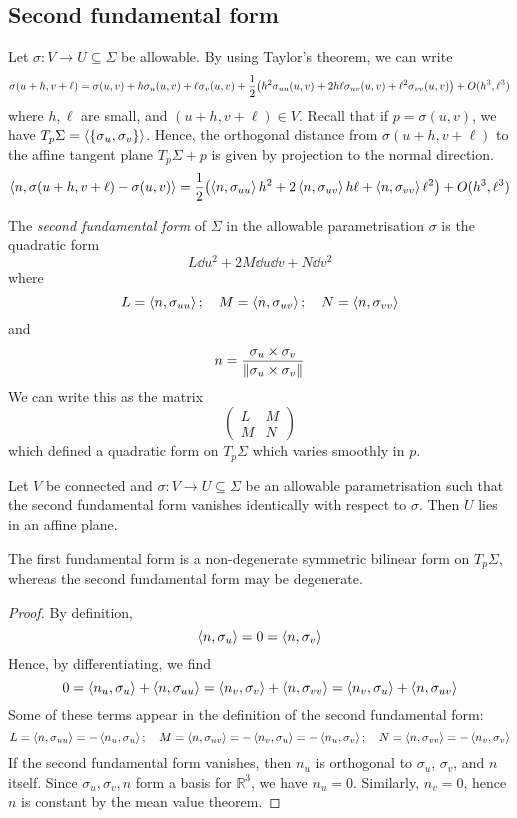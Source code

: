 \subsection{Second fundamental form}
Let \( \sigma \colon V \to U \subseteq \Sigma \) be allowable.
By using Taylor's theorem, we can write
\[ \sigma(u+h,v+\ell) = \sigma(u,v) + h \sigma_u(u,v) + \ell \sigma_v(u,v) + \frac{1}{2} \qty(h^2 \sigma_{uu}(u,v) + 2h\ell \sigma_{uv}(u,v) + \ell^2 \sigma_{vv}(u,v)) + O(h^3,\ell^3) \]
where \( h,\ell \) are small, and \( (u+h,v+\ell) \in V \).
Recall that if \( p = \sigma(u,v) \), we have \( T_p \Sigma = \langle{} \qty{\sigma_u,\sigma_v} \rangle \).
Hence, the orthogonal distance from \( \sigma(u+h,v+\ell) \) to the affine tangent plane \( T_p \Sigma + p \) is given by projection to the normal direction.
\[ \left\langle{n,\sigma(u+h,v+\ell) - \sigma(u,v)}\right\rangle = \frac{1}{2} \qty(\left\langle{n,\sigma_{uu}}\right\rangle h^2 + 2\left\langle{n,\sigma_{uv}}\right\rangle h\ell + \left\langle{n,\sigma_{vv}}\right\rangle\ell^2) + O(h^3,\ell^3) \]
\begin{definition}
	The \textit{second fundamental form} of \( \Sigma \) in the allowable parametrisation \( \sigma \) is the quadratic form
	\[ L \dd{u}^2 + 2 M \dd{u} \dd{v} + N \dd{v}^2 \]
	where
	\[ L = \left\langle{n,\sigma_{uu}}\right\rangle;\quad M = \left\langle{n,\sigma_{uv}}\right\rangle;\quad N = \left\langle{n,\sigma_{vv}}\right\rangle \]
	and
	\[ n = \frac{\sigma_u \times \sigma_v}{\norm{\sigma_u \times \sigma_v}} \]
	We can write this as the matrix
	\[ \begin{pmatrix}
		L & M \\
		M & N
	\end{pmatrix} \]
	which defined a quadratic form on \( T_p \Sigma \) which varies smoothly in \( p \).
\end{definition}
\begin{lemma}
	Let \( V \) be connected and \( \sigma \colon V \to U \subseteq \Sigma \) be an allowable parametrisation such that the second fundamental form vanishes identically with respect to \( \sigma \).
	Then \( U \) lies in an affine plane.
\end{lemma}
\begin{remark}
	The first fundamental form is a non-degenerate symmetric bilinear form on \( T_p \Sigma \), whereas the second fundamental form may be degenerate.
\end{remark}
\begin{proof}
	By definition,
	\[ \left\langle{n,\sigma_u}\right\rangle = 0 = \left\langle{n,\sigma_v}\right\rangle \]
	Hence, by differentiating, we find
	\[ 0 = \left\langle{n_u, \sigma_u}\right\rangle + \left\langle{n, \sigma_{uu}}\right\rangle = \left\langle{n_v, \sigma_v}\right\rangle + \left\langle{n, \sigma_{vv}}\right\rangle = \left\langle{n_v, \sigma_u}\right\rangle + \left\langle{n,\sigma_{uv}}\right\rangle \]
	Some of these terms appear in the definition of the second fundamental form:
	\[ L = \left\langle{n,\sigma_{uu}}\right\rangle = -\left\langle{n_u, \sigma_u}\right\rangle;\quad M = \left\langle{n,\sigma_{uv}}\right\rangle = -\left\langle{n_v, \sigma_u}\right\rangle = -\left\langle{n_u, \sigma_v}\right\rangle;\quad N = \left\langle{n,\sigma_{vv}}\right\rangle = -\left\langle{n_v, \sigma_v}\right\rangle \]
	If the second fundamental form vanishes, then \( n_u \) is orthogonal to \( \sigma_u \), \( \sigma_v \), and \( n \) itself.
	Since \( \sigma_u, \sigma_v, n \) form a basis for \( \mathbb R^3 \), we have \( n_u = 0 \).
	Similarly, \( n_v = 0 \), hence \( n \) is constant by the mean value theorem.
\end{proof}
